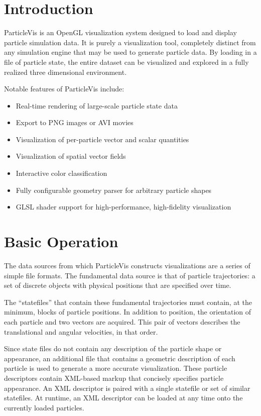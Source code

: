 \label{PVis-Guide}
\section{Introduction}

ParticleVis is an OpenGL visualization system designed to load and display particle simulation data.  It is purely a visualization tool, completely distinct from any simulation engine that may be used to generate particle data.  By loading in a file of particle state, the entire dataset can be visualized and explored in a fully realized three dimensional environment.

Notable features of ParticleVis include:
\begin{itemize}
	\item Real-time rendering of large-scale particle state data
	\item Export to PNG images or AVI movies
	\item Visualization of per-particle vector and scalar quantities
	\item Visualization of spatial vector fields
	\item Interactive color classification
	\item Fully configurable geometry parser for arbitrary particle shapes
	\item GLSL shader support for high-performance, high-fidelity visualization
\end{itemize}

\section{Basic Operation}

The data sources from which ParticleVis constructs visualizations are a series of simple file formats.  The fundamental data source is that of particle trajectories: a set of discrete objects with physical positions that are specified over time.

The ``statefiles'' that contain these fundamental trajectories must contain, at the minimum, blocks of particle positions.  In addition to position, the orientation of each particle and two vectors are acquired.  This pair of vectors describes the translational and angular velocities, in that order.

Since state files do not contain any description of the particle shape or appearance, an additional file that contains a geometric description of each particle is used to generate a more accurate visualization.  These particle descriptors contain XML-based markup that concisely specifies particle appearance.  An XML descriptor is paired with a single statefile or set of similar statefiles.  At runtime, an XML descriptor can be loaded at any time onto the currently loaded particles.

